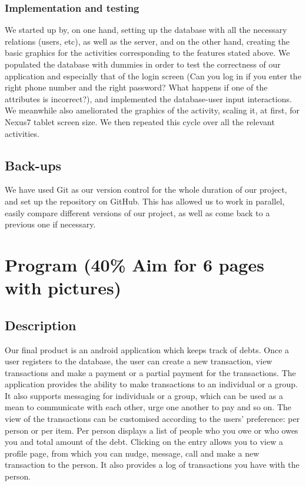 \documentclass[a4paper,11pt]{article}
\begin{document}
\subsubsection*{Implementation and testing}
We started up by, on one hand, setting up the database with all the necessary relations (users, etc), as well as the server, and on the other hand, creating the basic graphics for the activities corresponding to the features stated above. We populated the database with dummies in order to test the correctness of our application and especially that of the login screen (Can you log in if you enter the right phone number and the right password? What happens if one of the attributes is incorrect?), and implemented the database-user input interactions. We meanwhile also ameliorated the graphics of the activity, scaling it, at first, for Nexus7 tablet screen size. We then repeated this cycle over all the relevant activities.


\subsection*{Back-ups}
We have used Git as our version control for the whole duration of our project, and set up the repository on GitHub. This has allowed us to work in parallel, easily compare different versions of our project, as well as come back to a previous one if necessary.


\section*{Program (40\% Aim for 6 pages with pictures)}
\subsection*{Description}
Our final product is an android application which keeps track of debts. Once a user registers to the database, the user can create a new transaction, view transactions and make a payment or a partial payment for the transactions. The application provides the ability to make transactions to an individual or a group. It also supports messaging for individuals or a group, which can be used as a mean to communicate with each other, urge one another to pay and so on. The view of the transactions can be customised according to the users’ preference: per person or per item. Per person displays a list of people who you owe or who owes you and total amount of the debt. Clicking on the entry allows you to view a profile page, from which you can nudge, message, call and make a new transaction to the person. It also provides a log of transactions you have with the person.
\end{document}
